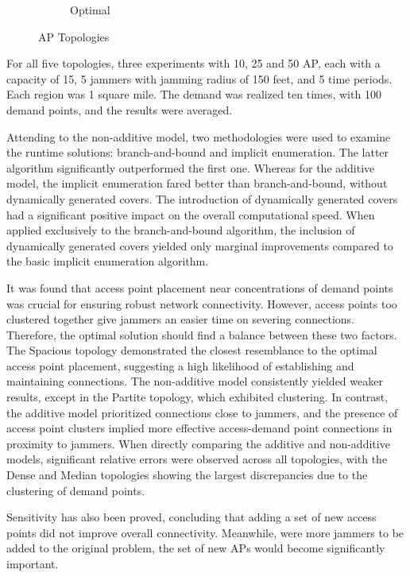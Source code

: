 \documentclass[runningheads]{llncs}
\begin{document}
\begin{figure}[H]
\begin{subfigure}{0.3\textwidth}
		\caption{Optimal}
		\label{fig:6}
	\end{subfigure}
	\caption{AP Topologies}
	\label{fig:images}
\end{figure}
	
	
	For all five topologies, three experiments with 10, 25 and 50 AP, each with a capacity of 15, 5 jammers with jamming radius of 150 feet, and 5 time periods. Each region was 1 square mile. The demand was realized ten times, with 100 demand points, and the results were averaged.
	
	
	Attending to the non-additive model, two methodologies were used to examine the runtime solutions: branch-and-bound and implicit enumeration. The latter algorithm significantly outperformed the first one. Whereas for the additive model, the implicit enumeration fared better than branch-and-bound, without dynamically generated covers. The introduction of dynamically generated covers had a significant positive impact on the overall computational speed. When applied exclusively to the branch-and-bound algorithm, the inclusion of dynamically generated covers yielded only marginal improvements compared to the basic implicit enumeration algorithm. 
	
	It was found that access point placement near concentrations of demand points was crucial for ensuring robust network connectivity. However, access points too clustered together give jammers an easier time on severing connections. Therefore, the optimal solution should find a balance between these two factors. The Spacious topology demonstrated the closest resemblance to the optimal access point placement, suggesting a high likelihood of establishing and maintaining connections. The non-additive model consistently yielded weaker results, except in the Partite topology, which exhibited clustering. In contrast, the additive model prioritized connections close to jammers, and the presence of access point clusters implied more effective access-demand point connections in proximity to jammers. When directly comparing the additive and non-additive models, significant relative errors were observed across all topologies, with the Dense and Median topologies showing the largest discrepancies due to the clustering of demand points.
	
	Sensitivity has also been proved, concluding that adding a set of new access points did not improve overall connectivity. Meanwhile, were more jammers to be added to the original problem, the set of new APs would become significantly important.
	
\end{document}
